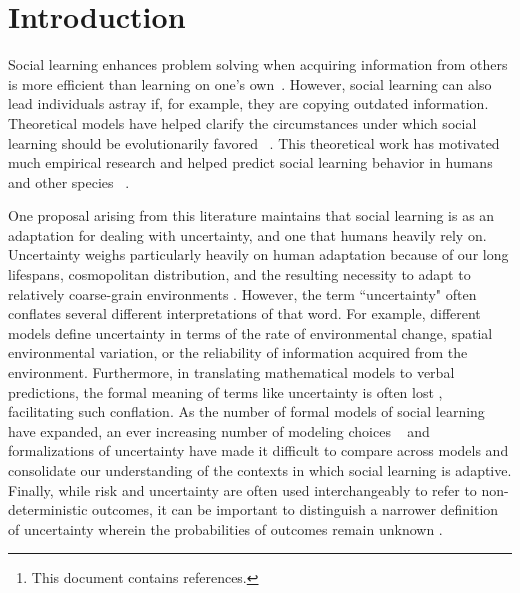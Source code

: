 \documentclass[letterpaper,11.5pt]{scrartcl}
\begin{document}
\begin{abstract}
\footnote{This document contains
 references.}  
\end{abstract}


\section{Introduction}

Social learning enhances problem solving when acquiring information from others is more efficient than learning on one's own~\cite{Laland2004}. However, social learning can also lead individuals astray if, for example, they are copying outdated information. Theoretical models have helped clarify the circumstances under which social learning should be evolutionarily favored ~\cite{BoydRicherson1985}. This theoretical work has motivated much empirical research and helped predict social learning behavior in humans and other species ~\cite{McElreath2005,Kendal2018,Allen2019}.

One proposal arising from this literature maintains that social learning is as an adaptation for dealing with uncertainty, and one that humans heavily rely on. Uncertainty weighs particularly heavily on human adaptation because of our long lifespans, cosmopolitan distribution, and the resulting necessity to adapt to relatively coarse-grain environments \cite{levins1962}. However, the term ``uncertainty" often conflates several different interpretations of that word. For example, different models define uncertainty in terms of the rate of environmental change, spatial environmental variation, or the reliability of information acquired from the environment. Furthermore, in translating mathematical models to verbal predictions, the formal meaning of terms like uncertainty is often lost \cite{lawson1988probability}, facilitating such conflation. As the number of formal models of social learning have expanded, an ever increasing number
of modeling choices ~\cite[Figure 1]{Kendal2018} and formalizations of uncertainty have made it difficult to compare across models and consolidate our understanding of the contexts in which social learning is adaptive. Finally, while risk and uncertainty are often used interchangeably to refer to non-deterministic outcomes, it can be important to distinguish a narrower definition of uncertainty wherein the probabilities of outcomes remain unknown \cite{knight1921, volz2012}.
\end{document}
